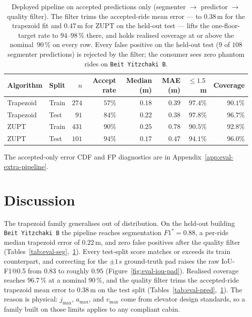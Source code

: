 \documentclass[manuscript,review,screen]{acmart}
\begin{document}
\begin{table}[H]
\centering
\small
\begin{tabular}{llrrrrrr}
\toprule
Algorithm & Split & $n$ & Accept rate & Median (m) & MAE (m) & $\le 1.5$\,m & Coverage \\
\midrule
Trapezoid & Train & $274$ & $57\%$ & $0.18$ & $0.39$ & $97.4\%$ & $90.1\%$ \\
Trapezoid & Test  & $\phantom{0}91$ & $84\%$ & $0.22$ & $0.38$ & $97.8\%$ & $96.7\%$ \\
ZUPT      & Train & $431$ & $90\%$ & $0.25$ & $0.78$ & $90.5\%$ & $92.8\%$ \\
ZUPT      & Test  & $101$ & $94\%$ & $0.17$ & $0.47$ & $94.1\%$ & $96.0\%$ \\
\bottomrule
\end{tabular}
\caption{Deployed pipeline on accepted predictions only
  (segmenter $\to$ predictor $\to$ quality filter).  The filter
  trims the accepted-ride mean error --- to $0.38\,$m for the
  trapezoid fit and $0.47\,$m for ZUPT on the held-out test ---
  lifts the one-floor-target rate to $94\text{--}98\,\%$ there, and
  holds realised coverage at or above the nominal~$90\,\%$ on every
  row.  Every false positive on the held-out test ($9$ of $108$
  segmenter predictions) is rejected by the filter; the consumer
  sees zero phantom rides on \texttt{Beit Yitzchaki~B}.}
\label{tab:eval-pipeline}
\end{table}

The accepted-only error CDF and FP diagnostics are in
Appendix~\ref{app:eval-extra-pipeline}.

\section{Discussion}
\label{sec:discussion}

The trapezoid family generalises out of distribution.  On the held-out
building \texttt{Beit Yitzchaki~B} the pipeline reaches segmentation
$F1^{\ast}\!=\!0.88$, a per-ride median trapezoid error of $0.22\,$m,
and zero false positives after the quality filter
(Tables~\ref{tab:eval-seg},~\ref{tab:eval-pipeline}).  Every test-split
score matches or exceeds its train counterpart, and correcting for the
$\pm 1\,$s ground-truth pad raises the raw IoU-F1@0.5 from $0.83$ to
roughly $0.95$ (Figure~\ref{fig:eval-iou-pad}).  Realised coverage
reaches $96.7\,\%$ at a nominal $90\,\%$, and the quality filter trims
the accepted-ride trapezoid mean error to $0.38\,$m on the test split
(Tables~\ref{tab:eval-pred},~\ref{tab:eval-pipeline}).  The reason is
physical: $j_{\max}$, $a_{\max}$, and $v_{\max}$ come from elevator
design standards, so a family built on those limits applies to any
compliant cabin.
\end{document}
